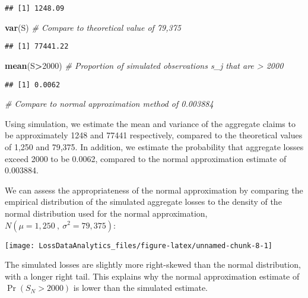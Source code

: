 \documentclass[]{book}
\newenvironment{Shaded}{\begin{snugshade}}{\end{snugshade}}
\newcommand{\KeywordTok}[1]{\textcolor[rgb]{0.13,0.29,0.53}{\textbf{#1}}}
\newcommand{\DecValTok}[1]{\textcolor[rgb]{0.00,0.00,0.81}{#1}}
\newcommand{\CommentTok}[1]{\textcolor[rgb]{0.56,0.35,0.01}{\textit{#1}}}
\newcommand{\OperatorTok}[1]{\textcolor[rgb]{0.81,0.36,0.00}{\textbf{#1}}}
\newcommand{\NormalTok}[1]{#1}
\theoremstyle{definition}
\theoremstyle{definition}
\theoremstyle{definition}
\theoremstyle{remark}
\begin{document}
\begin{verbatim}
## [1] 1248.09
\end{verbatim}

\begin{Shaded}
\begin{Highlighting}[]
\KeywordTok{var}\NormalTok{(S)  }\CommentTok{# Compare to theoretical value of 79,375}
\end{Highlighting}
\end{Shaded}

\begin{verbatim}
## [1] 77441.22
\end{verbatim}

\begin{Shaded}
\begin{Highlighting}[]
\KeywordTok{mean}\NormalTok{(S}\OperatorTok{>}\DecValTok{2000}\NormalTok{) }\CommentTok{# Proportion of simulated observations s_j that are > 2000}
\end{Highlighting}
\end{Shaded}

\begin{verbatim}
## [1] 0.0062
\end{verbatim}

\begin{Shaded}
\begin{Highlighting}[]
\CommentTok{# Compare to normal approximation method of 0.003884}
\end{Highlighting}
\end{Shaded}

Using simulation, we estimate the mean and variance of the aggregate
claims to be approximately 1248 and 77441 respectively, compared to the
theoretical values of 1,250 and 79,375. In addition, we estimate the
probability that aggregate losses exceed 2000 to be 0.0062, compared to
the normal approximation estimate of 0.003884.

We can assess the appropriateness of the normal approximation by
comparing the empirical distribution of the simulated aggregate losses
to the density of the normal distribution used for the normal
approximation, \(N(\mu=1,250~, ~\sigma^2=79,375)\):

\begin{center}\texttt{[image: LossDataAnalytics\_files/figure-latex/unnamed-chunk-8-1]} \end{center}

The simulated losses are slightly more right-skewed than the normal
distribution, with a longer right tail. This explains why the normal
approximation estimate of \(\Pr(S_N > 2000)\) is lower than the
simulated estimate.
\end{document}
